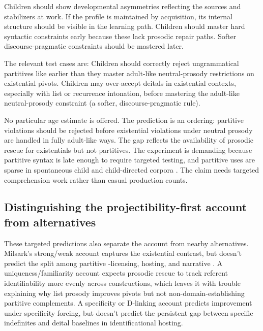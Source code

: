 \documentclass[12pt,letterpaper]{article}
\begin{document}
Children should show developmental asymmetries reflecting the sources and stabilizers at work. If the profile is maintained by acquisition, its internal structure should be visible in the learning path. Children should master hard syntactic constraints early because these lack prosodic repair paths. Softer discourse-pragmatic constraints should be mastered later.

The relevant test cases are:
\ea
    \ea Children should correctly reject ungrammatical partitives like  earlier than they master adult-like neutral-prosody restrictions on existential pivots.
    \ex Children may over-accept deitals in existential  contexts, especially with list or recurrence intonation, before mastering the adult-like neutral-prosody constraint (a softer, discourse-pragmatic rule).
    \z
\z

\noindent No particular age estimate is offered. The prediction is an ordering: partitive  violations should be rejected before existential violations under neutral prosody are handled in fully adult-like ways. The gap reflects the availability of prosodic rescue for existentials but not partitives. The experiment is demanding because partitive syntax is late enough to require targeted testing, and partitive uses are sparse in spontaneous child and child-directed corpora \parencite{Stickney2007,BloomWynn1997}. The claim needs targeted comprehension work rather than casual production counts.

\subsection{Distinguishing the projectibility-first account from alternatives}

These targeted predictions also separate the account from nearby alternatives. Milsark's strong/weak account captures the existential contrast, but doesn't predict the split among partitive -licensing, hosting, and narrative . A uniqueness/familiarity account expects prosodic rescue to track referent identifiability more evenly across constructions, which leaves it with trouble explaining why list prosody improves  pivots but not non-domain-establishing partitive  complements. A specificity or D-linking account predicts improvement under specificity forcing, but doesn't predict the persistent gap between specific indefinites and deital baselines in identificational hosting.
\end{document}

